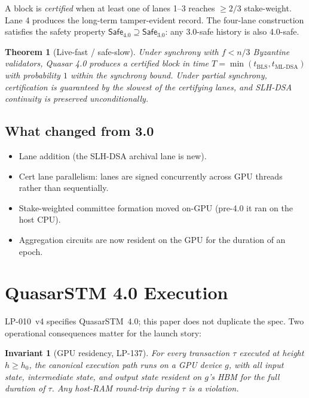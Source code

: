 \documentclass[11pt,a4paper]{article}
\newtheorem{theorem}{Theorem}[section]
\newtheorem{invariant}{Invariant}[section]
\begin{document}
A block is \emph{certified} when at least one of lanes 1--3 reaches
$\ge 2/3$ stake-weight. Lane 4 produces the long-term tamper-evident
record. The four-lane construction satisfies the safety property
$\mathsf{Safe}_{\text{4.0}} \supseteq \mathsf{Safe}_{\text{3.0}}$: any
3.0-safe history is also 4.0-safe.

\begin{theorem}[Live-fast / safe-slow]
Under synchrony with $f < n/3$ Byzantine validators, Quasar 4.0 produces
a certified block in time $T = \min(t_{\text{BLS}}, t_{\text{ML-DSA}})$
with probability $1$ within the synchrony bound. Under partial
synchrony, certification is guaranteed by the slowest of the
certifying lanes, and SLH-DSA continuity is preserved unconditionally.
\end{theorem}

\subsection{What changed from 3.0}

\begin{itemize}[leftmargin=*]
\item Lane addition (the SLH-DSA archival lane is new).
\item Cert lane parallelism: lanes are signed concurrently across
GPU threads rather than sequentially.
\item Stake-weighted committee formation moved on-GPU (pre-4.0 it ran
on the host CPU).
\item Aggregation circuits are now resident on the GPU for the duration
of an epoch.
\end{itemize}

\section{QuasarSTM 4.0 Execution}
\label{sec:stm4}

LP-010~v4 specifies QuasarSTM~4.0; this paper does not duplicate the
spec. Two operational consequences matter for the launch story:

\begin{invariant}[GPU residency, LP-137]
For every transaction $\tau$ executed at height $h \ge h_0$, the
canonical execution path runs on a GPU device $g$, with all input
state, intermediate state, and output state resident on $g$'s HBM for
the full duration of $\tau$. Any host-RAM round-trip during $\tau$ is
a violation.
\end{invariant}
\end{document}

